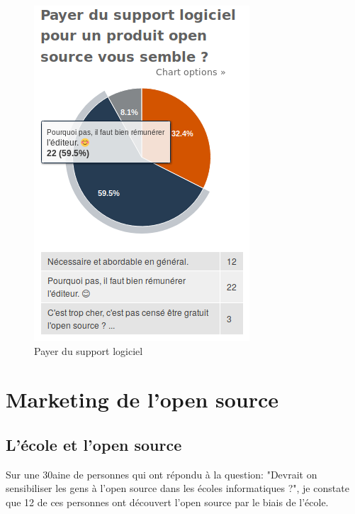 		\begin{figure}[h]
			\center
			\includegraphics[scale=0.58]{./img/a11}
			\caption{Payer du support logiciel}					
		\end{figure}

	\newpage

	\section{Marketing de l'open source}

		\subsection{L'école et l'open source}

			Sur une 30aine de personnes qui ont répondu à la question: "Devrait on sensibiliser les gens à l'open source dans les écoles informatiques ?", je constate que 12 de ces personnes ont découvert l'open source par le biais de l'école.

